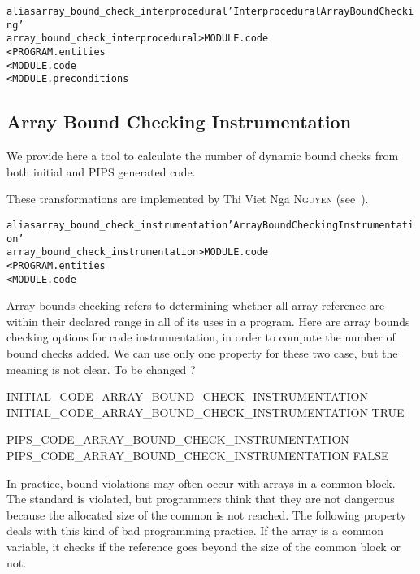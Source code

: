 \documentclass[a4paper]{report}
\newenvironment{PipsMake}{\begin{alltt}}{\end{alltt}}
\newenvironment{PipsPass}[1]{\label{pass:#1}}{}
\begin{document}
\begin{PipsMake}
alias array_bound_check_interprocedural 'Interprocedural Array Bound Checking'
array_bound_check_interprocedural             > MODULE.code
        < PROGRAM.entities
        < MODULE.code
        < MODULE.preconditions
\end{PipsMake}



\subsection{Array Bound Checking Instrumentation}
\label{subsection-array-bound-check_instrumentation}

\begin{PipsPass}{array_bound_check_instrumentation}

We provide here a tool to calculate the number of dynamic bound checks
from both initial and PIPS generated code.

These transformations are implemented by Thi Viet Nga \textsc{Nguyen} (see~\cite{Ngu02}).
\end{PipsPass}

\begin{PipsMake}
alias array_bound_check_instrumentation 'Array Bound Checking Instrumentation'
array_bound_check_instrumentation > MODULE.code
        < PROGRAM.entities
        < MODULE.code
\end{PipsMake}



Array bounds checking refers to determining whether all array reference
are within their declared range in all of its uses in a program. Here are
array bounds checking options for code instrumentation, in order to
compute the number of bound checks added. We can use only one property for
these two case, but the meaning is not clear. To be changed ?

\begin{PipsProp}{INITIAL_CODE_ARRAY_BOUND_CHECK_INSTRUMENTATION}
INITIAL_CODE_ARRAY_BOUND_CHECK_INSTRUMENTATION TRUE
\end{PipsProp}
\begin{PipsProp}{PIPS_CODE_ARRAY_BOUND_CHECK_INSTRUMENTATION}
PIPS_CODE_ARRAY_BOUND_CHECK_INSTRUMENTATION FALSE
\end{PipsProp}

In practice, bound violations may often occur with arrays in a common block. The
standard is violated, but programmers think that they are not dangerous
because the allocated size of the common is not reached.
The following property deals with this kind of bad programming practice. If the
array is a common variable, it checks if the reference goes beyond the
size of the common block or not.
\end{document}
